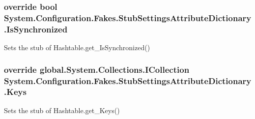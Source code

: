 \hypertarget{class_system_1_1_configuration_1_1_fakes_1_1_stub_settings_attribute_dictionary_a8f8426aa3dc7e8e10a0ac85cb95c156d}{
\subsubsection[{Is\-Synchronized}]{\setlength{\rightskip}{0pt plus 5cm}override bool System.\-Configuration.\-Fakes.\-Stub\-Settings\-Attribute\-Dictionary.\-Is\-Synchronized\hspace{0.3cm}{\ttfamily [get]}}}\label{class_system_1_1_configuration_1_1_fakes_1_1_stub_settings_attribute_dictionary_a8f8426aa3dc7e8e10a0ac85cb95c156d}


Sets the stub of Hashtable.\-get\-\_\-\-Is\-Synchronized()

\hypertarget{class_system_1_1_configuration_1_1_fakes_1_1_stub_settings_attribute_dictionary_a30d4610731f134a7f97bdcc609c715a2}{
\subsubsection[{Keys}]{\setlength{\rightskip}{0pt plus 5cm}override global.\-System.\-Collections.\-I\-Collection System.\-Configuration.\-Fakes.\-Stub\-Settings\-Attribute\-Dictionary.\-Keys\hspace{0.3cm}{\ttfamily [get]}}}\label{class_system_1_1_configuration_1_1_fakes_1_1_stub_settings_attribute_dictionary_a30d4610731f134a7f97bdcc609c715a2}


Sets the stub of Hashtable.\-get\-\_\-\-Keys()

